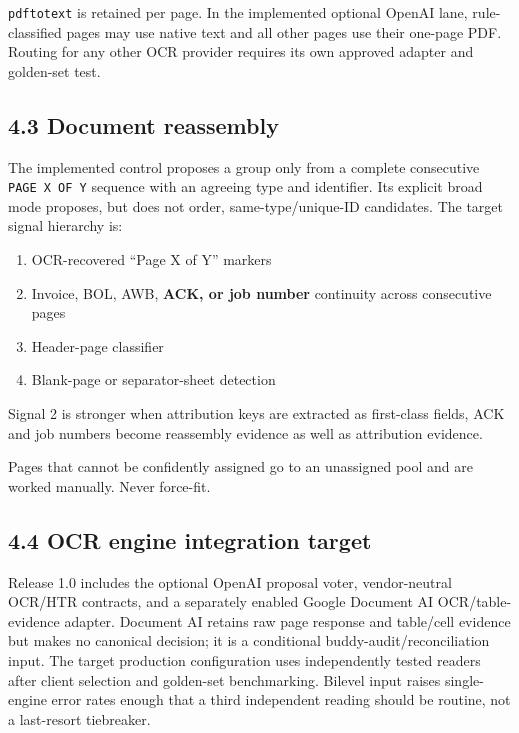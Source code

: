 \documentclass[
]{article}
\providecommand{\tightlist}{%
  \setlength{\itemsep}{0pt}\setlength{\parskip}{0pt}}
\begin{document}
\texttt{pdftotext} is retained per page. In the implemented optional
OpenAI lane, rule-classified pages may use native text and all other
pages use their one-page PDF. Routing for any other OCR provider
requires its own approved adapter and golden-set test.

\subsection{4.3 Document reassembly}\label{document-reassembly}

The implemented control proposes a group only from a complete
consecutive \texttt{PAGE\ X\ OF\ Y} sequence with an agreeing type and
identifier. Its explicit broad mode proposes, but does not order,
same-type/unique-ID candidates. The target signal hierarchy is:

\begin{enumerate}
\def\labelenumi{\arabic{enumi}.}
\tightlist
\item
  OCR-recovered ``Page X of Y'' markers
\item
  Invoice, BOL, AWB, \textbf{ACK, or job number} continuity across
  consecutive pages
\item
  Header-page classifier
\item
  Blank-page or separator-sheet detection
\end{enumerate}

Signal 2 is stronger when attribution keys are extracted as first-class
fields, ACK and job numbers become reassembly evidence as well as
attribution evidence.

Pages that cannot be confidently assigned go to an unassigned pool and
are worked manually. Never force-fit.

\subsection{4.4 OCR engine integration
target}\label{ocr-engine-integration-target}

Release 1.0 includes the optional OpenAI proposal voter, vendor-neutral
OCR/HTR contracts, and a separately enabled Google Document AI
OCR/table-evidence adapter. Document AI retains raw page response and
table/cell evidence but makes no canonical decision; it is a conditional
buddy-audit/reconciliation input. The target production configuration
uses independently tested readers after client selection and golden-set
benchmarking. Bilevel input raises single-engine error rates enough that
a third independent reading should be routine, not a last-resort
tiebreaker.
\end{document}
